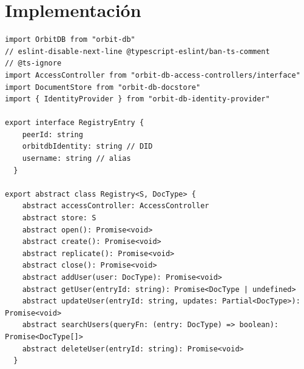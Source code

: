 \section{Implementación}


\begin{verbatim}
import OrbitDB from "orbit-db"
// eslint-disable-next-line @typescript-eslint/ban-ts-comment
// @ts-ignore
import AccessController from "orbit-db-access-controllers/interface"
import DocumentStore from "orbit-db-docstore"
import { IdentityProvider } from "orbit-db-identity-provider"

export interface RegistryEntry {
    peerId: string
    orbitdbIdentity: string // DID
    username: string // alias
  }

export abstract class Registry<S, DocType> {
    abstract accessController: AccessController
    abstract store: S
    abstract open(): Promise<void>
    abstract create(): Promise<void>
    abstract replicate(): Promise<void>
    abstract close(): Promise<void>
    abstract addUser(user: DocType): Promise<void>
    abstract getUser(entryId: string): Promise<DocType | undefined>
    abstract updateUser(entryId: string, updates: Partial<DocType>): Promise<void>
    abstract searchUsers(queryFn: (entry: DocType) => boolean): Promise<DocType[]>
    abstract deleteUser(entryId: string): Promise<void>
  }
\end{verbatim}